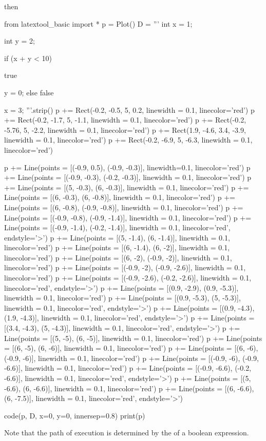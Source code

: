 then
\begin{python}
from latextool_basic import *
p = Plot()
D = '''
int x = 1;


int y = 2;


if (x + y < 10)

     true

          y = 0;
else
     false



x = 3;
'''.strip()
p += Rect(-0.2, -0.5, 5, 0.2, linewidth = 0.1, linecolor='red')
p += Rect(-0.2, -1.7, 5, -1.1, linewidth = 0.1, linecolor='red')
p += Rect(-0.2, -5.76, 5, -2.2, linewidth = 0.1, linecolor='red')
p += Rect(1.9, -4.6, 3.4, -3.9, linewidth = 0.1, linecolor='red')
p += Rect(-0.2, -6.9, 5, -6.3, linewidth = 0.1, linecolor='red')

p += Line(points = [(-0.9, 0.5), (-0.9, -0.3)], linewidth=0.1, linecolor='red')
p += Line(points = [(-0.9, -0.3), (-0.2, -0.3)], linewidth = 0.1, linecolor='red')
p += Line(points = [(5, -0.3), (6, -0.3)], linewidth = 0.1, linecolor='red') 
p += Line(points = [(6, -0.3), (6, -0.8)], linewidth = 0.1, linecolor='red')
p += Line(points = [(6, -0.8), (-0.9, -0.8)], linewidth = 0.1, linecolor='red')
p += Line(points = [(-0.9, -0.8), (-0.9, -1.4)], linewidth = 0.1, linecolor='red')
p += Line(points = [(-0.9, -1.4), (-0.2, -1.4)], linewidth = 0.1, linecolor='red', endstyle='>')
p += Line(points = [(5, -1.4), (6, -1.4)], linewidth = 0.1, linecolor='red')
p += Line(points = [(6, -1.4), (6, -2)], linewidth = 0.1, linecolor='red')
p += Line(points = [(6, -2), (-0.9, -2)], linewidth = 0.1, linecolor='red')
p += Line(points = [(-0.9, -2), (-0.9, -2.6)], linewidth = 0.1, linecolor='red')
p += Line(points = [(-0.9, -2.6), (-0.2, -2.6)], linewidth = 0.1, linecolor='red', endstyle='>')
p += Line(points = [(0.9, -2.9), (0.9, -5.3)], linewidth = 0.1, linecolor='red')
p += Line(points = [(0.9, -5.3), (5, -5.3)], linewidth = 0.1, linecolor='red', endstyle='>')
p += Line(points = [(0.9, -4.3), (1.9, -4.3)], linewidth = 0.1, linecolor='red', endstyle='>')
p += Line(points = [(3.4, -4.3), (5, -4.3)], linewidth = 0.1, linecolor='red', endstyle='>')
p += Line(points = [(5, -5), (6, -5)], linewidth = 0.1, linecolor='red')
p += Line(points = [(6, -5), (6, -6)], linewidth = 0.1, linecolor='red')
p += Line(points = [(6, -6), (-0.9, -6)], linewidth = 0.1, linecolor='red')
p += Line(points = [(-0.9, -6), (-0.9, -6.6)], linewidth = 0.1, linecolor='red')
p += Line(points = [(-0.9, -6.6), (-0.2, -6.6)], linewidth = 0.1, linecolor='red', endstyle='>')
p += Line(points = [(5, -6.6), (6, -6.6)], linewidth = 0.1, linecolor='red')
p += Line(points = [(6, -6.6), (6, -7.5)], linewidth = 0.1, linecolor='red', endstyle='>')

code(p, D, x=0, y=0, innersep=0.8)
print(p)
\end{python}
Note that the path of execution is determined by the  of a boolean expression.

